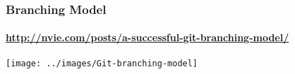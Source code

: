 \begin{frame}[t]{}
  \frametitle{Branching Model}
  \framesubtitle{ \url{http://nvie.com/posts/a-successful-git-branching-model/} }

  \begin{center} 
    \texttt{[image: ../images/Git-branching-model]}
  \end{center}
\end{frame}


% 
% 
% 
% 
% 
% 
% 
% 
